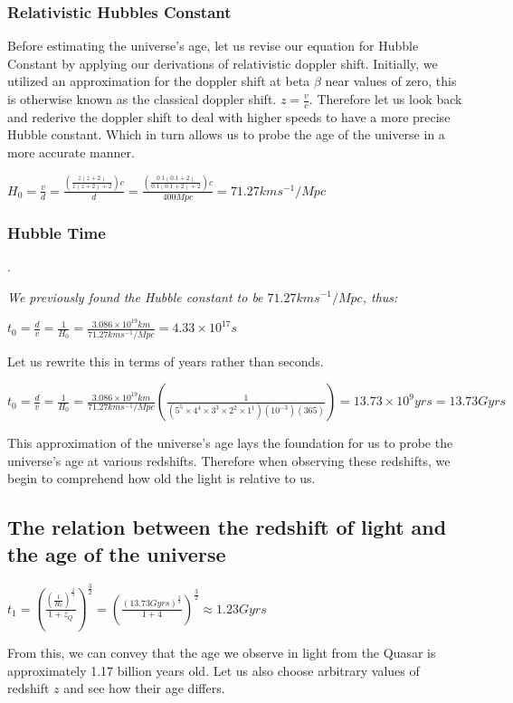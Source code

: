 \documentclass{article}
\begin{document}
{\subsubsection{Relativistic Hubbles Constant}
Before estimating the universe's age, let us revise our equation for Hubble Constant by applying our derivations of relativistic doppler shift. Initially, we utilized an approximation for the doppler shift at beta $\beta$ near values of zero, this is otherwise known as the classical doppler shift. $ z =\frac{v}{c}$. Therefore let us look back and rederive the doppler shift to deal with higher speeds to have a more precise Hubble constant. Which in turn allows us to probe the age of the universe in a more accurate manner.
\begin{center}
	$\boxed{
H_0 = \frac{v}{d} = \frac{ \left(\frac{z(z+2)}{z(z+2)+2}\right)c }{d} = \frac{ \left(\frac{0.1(0.1+2)}{0.1(0.1+2)+2}\right)c }{400Mpc} = 71.27 kms^{-1}/Mpc}
$
\end{center}
\subsubsection{Hubble Time}
.

\textit{We previously found the Hubble constant to be $71.27kms^{-1}/Mpc$, thus:}
\begin{center}
	$\boxed{
	t_0 = \frac{d}{v}=\frac{1}{H_0} = \frac{3.086\times10^{19}km}{71.27kms^{-1}/Mpc} = 4.33\times10^{17}s}
	$
\end{center}
Let us rewrite this in terms of years rather than seconds.
\begin{center}
	$\boxed{
		t_0 = \frac{d}{v}=\frac{1}{H_0}= \frac{3.086\times10^{19}km}{71.27kms^{-1}/Mpc}\left(\frac{1}{(5^5\times4^4\times3^3\times2^2\times1^1)(10^{-3})(365)}\right)=13.73\times10^9yrs=13.73Gyrs}
	$
\end{center}
This approximation of the universe's age lays the foundation for us to probe the universe's age at various redshifts. Therefore when observing these redshifts, we begin to comprehend how old the light is relative to us.
\subsection{The relation between the redshift of light and the age of the universe}

\begin{center}
	$\boxed{ t_1 = \left(\frac{\left(\frac{1}{H_0}\right)^{\frac{2}{3}}}{1+z_Q}\right)^{\frac{3}{2}} = \left(\frac{\left(13.73Gyrs\right)^{\frac{2}{3}}}{1+4}\right)^{\frac{3}{2}} \approx 1.23Gyrs}$
\end{center}
From this, we can convey that the age we observe in light from the Quasar is approximately 1.17 billion years old. Let us also choose arbitrary values of redshift $z$ and see how their age differs.

}
\end{document}

